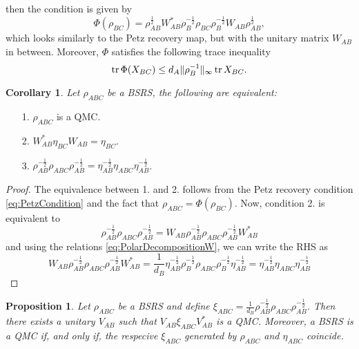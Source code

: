 \documentclass[11pt]{article}
\theoremstyle{newdefinition}
\theoremstyle{newplain}
\newtheorem{proposition}[definition]{Proposition}
\newtheorem{corollary}[definition]{Corollary}
\theoremstyle{myplain}
\DeclareMathOperator{\1}{\mathds{1}}
\begin{document}
{\begin{equation}
    \end{equation}
    then the condition   is given by
\begin{equation}
    \Phi(\rho_{BC})=\rho_{AB}^{\frac{1}{2}}W_{AB}^*\rho_B^{-\frac{1}{2}}\rho_{BC}\rho_B^{-\frac{1}{2}}W_{AB}\rho_{AB}^{\frac{1}{2}},
\end{equation}
which looks similarly to the Petz recovery map, but with the unitary matrix $W_{AB}$ in between. Moreover, $\Phi$ satisfies the following trace inequality
\begin{equation}
    \tr \Phi(X_{BC}) \leq d_A \Vert \rho_B^{-1}\Vert_{\infty}\tr X_{BC}.
\end{equation}
\begin{corollary}
    Let $\rho_{ABC}$ be a BSRS, the following are equivalent:
\end{corollary}
\begin{itemize}
    \item[1.] $\rho_{ABC}$ is a QMC.
    \item[2.] $W_{AB}^*\eta_{BC}W_{AB}=\eta_{BC}$.
    \item[3.] $\rho_{AB}^{-\frac{1}{2}}\rho_{ABC}\rho_{AB}^{-\frac{1}{2}}=\eta_{AB}^{-\frac{1}{2}}\eta_{ABC}\eta_{AB}^{-\frac{1}{2}}$. 
\end{itemize}
\begin{proof}
    The equivalence between 1. and 2. follows from the Petz recovery condition \eqref{eq:PetzCondition} and the fact that $\rho_{ABC}=\Phi(\rho_{BC})$.  Now, condition 2. is equivalent to
    \begin{equation}
        \rho_{AB}^{-\frac{1}{2}}\rho_{ABC}\rho_{AB}^{-\frac{1}{2}}=W_{AB}\rho_{AB}^{-\frac{1}{2}}\rho_{ABC}\rho_{AB}^{-\frac{1}{2}}W_{AB}^*
    \end{equation}
    and using the relations \eqref{eq:PolarDecompositionW}, we can write the RHS as
    \begin{equation}
        W_{AB}\rho_{AB}^{-\frac{1}{2}}\rho_{ABC}\rho_{AB}^{-\frac{1}{2}}W_{AB}^*=\frac{1}{d_B}\eta_{AB}^{-\frac{1}{2}}\rho_B^{-\frac{1}{2}}\rho_{ABC}\rho_B^{-\frac{1}{2}}\eta_{AB}^{-\frac{1}{2}}=\eta_{AB}^{-\frac{1}{2}}\eta_{ABC}\eta_{AB}^{-\frac{1}{2}}
    \end{equation}
\end{proof}
\begin{proposition}
    Let $\rho_{ABC}$ be a BSRS and define $\xi_{ABC}=\frac{1}{d_B}\rho_{AB}^{-\frac{1}{2}}\rho_{ABC}\rho_{AB}^{-\frac{1}{2}}$. Then there exists a unitary $V_{AB}$ such that $V_{AB}\xi_{ABC}V_{AB}^*$ is a QMC. Moreover, a BSRS is a QMC if, and only if, the respecive $\xi_{ABC}$ generated by $\rho_{ABC}$ and $\eta_{ABC}$ coincide.

\end{proposition}}
\end{document}
